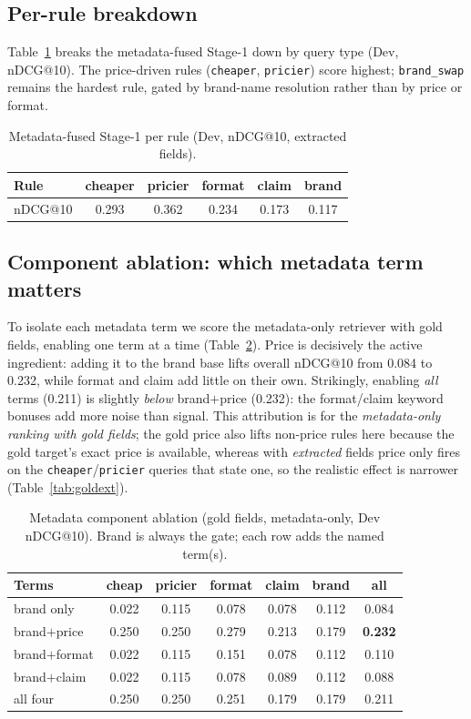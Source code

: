 \documentclass[sigconf,nonacm]{acmart}
\begin{document}
\subsection{Per-rule breakdown}
Table~\ref{tab:perrule} breaks the metadata-fused Stage-1 down by query type
(Dev, nDCG@10). The price-driven rules (\texttt{cheaper}, \texttt{pricier})
score highest; \texttt{brand\_swap} remains the hardest rule, gated by
brand-name resolution rather than by price or format.

\begin{table}[t]
\centering\small
\caption{Metadata-fused Stage-1 per rule (Dev, nDCG@10, extracted fields).}
\label{tab:perrule}
\begin{tabular}{@{}lccccc@{}}
\toprule
Rule & cheaper & pricier & format & claim & brand \\
\midrule
nDCG@10 & 0.293 & 0.362 & 0.234 & 0.173 & 0.117 \\
\bottomrule
\end{tabular}
\end{table}

\subsection{Component ablation: which metadata term matters}
\label{sec:ablation}
To isolate each metadata term we score the metadata-only retriever with gold
fields, enabling one term at a time (Table~\ref{tab:ablation}). Price is
decisively the active ingredient: adding it to the brand base lifts overall
nDCG@10 from 0.084 to 0.232, while format and claim add little on their own.
Strikingly, enabling \emph{all} terms (0.211) is slightly \emph{below}
brand$+$price (0.232): the format/claim keyword bonuses add more noise than
signal. This attribution is for the \emph{metadata-only ranking with gold
fields}; the gold price also lifts non-price rules here because the gold
target's exact price is available, whereas with \emph{extracted} fields price
only fires on the \texttt{cheaper}/\texttt{pricier} queries that state one, so
the realistic effect is narrower (Table~\ref{tab:goldext}).

\begin{table}[t]
\centering\small
\caption{Metadata component ablation (gold fields, metadata-only, Dev
nDCG@10). Brand is always the gate; each row adds the named term(s).}
\label{tab:ablation}
\begin{tabular}{@{}lcccccc@{}}
\toprule
Terms & cheap & pricier & format & claim & brand & \textbf{all} \\
\midrule
brand only        & 0.022 & 0.115 & 0.078 & 0.078 & 0.112 & 0.084 \\
brand$+$price     & 0.250 & 0.250 & 0.279 & 0.213 & 0.179 & \textbf{0.232} \\
brand$+$format    & 0.022 & 0.115 & 0.151 & 0.078 & 0.112 & 0.110 \\
brand$+$claim     & 0.022 & 0.115 & 0.078 & 0.089 & 0.112 & 0.088 \\
all four          & 0.250 & 0.250 & 0.251 & 0.179 & 0.179 & 0.211 \\
\bottomrule
\end{tabular}
\end{table}
\end{document}
